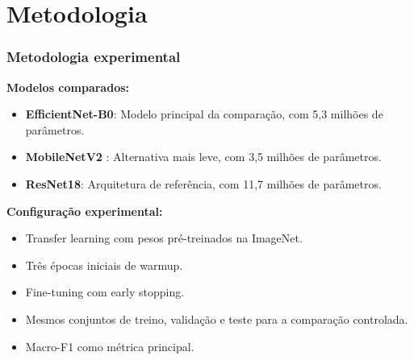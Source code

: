 \section{Metodologia}

\begin{frame}
	
	\frametitle{Metodologia experimental}
	\textbf{Modelos comparados:}
	\begin{itemize}
		\item \textbf{EfficientNet-B0}: Modelo principal da comparação, com 5,3 milhões de parâmetros.
		\item \textbf{MobileNetV2 }: Alternativa mais leve, com 3,5 milhões de parâmetros.
		\item \textbf{ResNet18}: Arquitetura de referência, com 11,7 milhões de parâmetros.
	\end{itemize}
	
	\textbf{Configuração experimental:}
	\begin{itemize}
		\item Transfer learning com pesos pré-treinados na ImageNet.
		\item Três épocas iniciais de warmup.
		\item Fine-tuning com early stopping.
		\item Mesmos conjuntos de treino, validação e teste para a comparação controlada.
		\item Macro-F1 como métrica principal.
	\end{itemize}
			
\end{frame}


